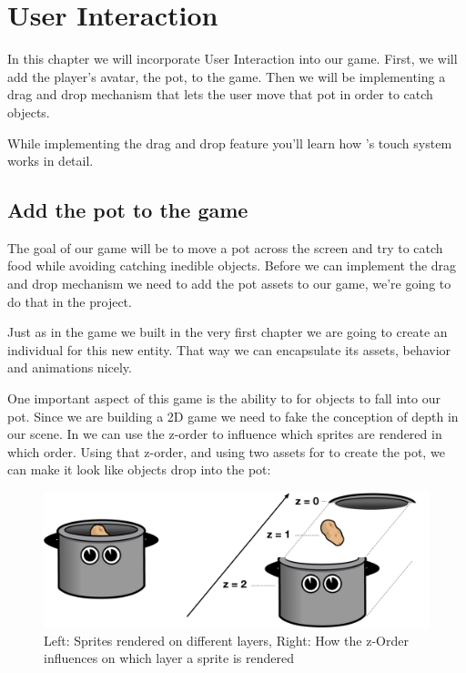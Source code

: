 \chapter{User Interaction}

In this chapter we will incorporate User Interaction into our game. First, we
will add the player's avatar, the pot, to the game. Then we will be
implementing a drag and drop mechanism that lets the user move that pot in order
to catch objects.

While implementing the drag and drop feature you'll learn how \cocos{}'s touch
system works in detail.

\section{Add the pot to the game}
The goal of our game will be to move a pot across the screen and try to catch
food while avoiding catching inedible objects. Before we can
implement the drag and drop mechanism we need to add the pot assets to our game,
we're going to do that in the \SB{} project.

Just as in the game we built in the very first chapter we are going to create an
individual \ccbfile{} for this new entity. That way we can encapsulate its
assets, behavior and animations nicely.

One important aspect of this game is the ability to for objects to fall into
our pot. Since we are building a 2D game we need to fake the conception of depth
in our scene. In \cocos{} we can use the z-order to influence which sprites are
rendered in which order. Using that z-order, and using two assets for to create
the pot, we can make it look like objects drop into the pot:

\begin{figure}[H]
    \centering
    \includegraphics[width=0.9\linewidth]{images/Chapter3/drawing_order.png}
    \caption{Left: Sprites rendered on different layers, Right: How the z-Order
    influences on which layer a sprite is rendered}
\end{figure}

